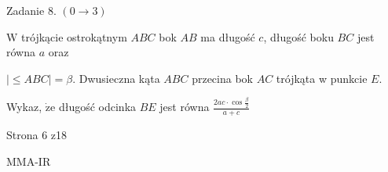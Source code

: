 \documentclass[a4paper,12pt]{article}
\begin{document}
Zadanie 8. $(0\rightarrow 3)$

$\mathrm{W}$ trójkącie ostrokątnym $ABC$ bok $AB$ ma długość $c$, długość boku $BC$ jest równa $a$ oraz

$|\leq ABC|=\beta$. Dwusieczna kąta $ABC$ przecina bok $AC$ trójkąta w punkcie $E.$

Wykaz, $\dot{\mathrm{z}}\mathrm{e}$ długość odcinka $BE$ jest równa $\displaystyle \frac{2ac\cdot\cos\frac{\beta}{2}}{a+c}$

Strona 6 z18

MMA-IR
\end{document}
